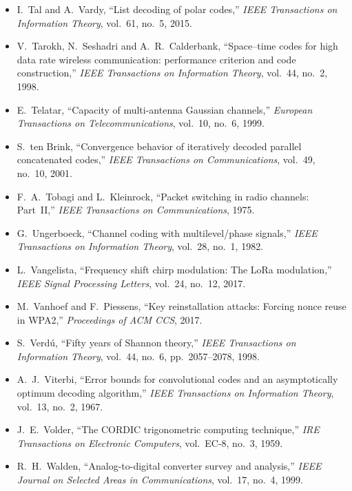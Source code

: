\begin{itemize}[leftmargin=1.5em,itemindent=-1.5em,itemsep=1.5pt plus 1pt,parsep=0pt,topsep=4pt,label={}]
\item I.~Tal and A.~Vardy, ``List decoding of polar codes,'' \emph{IEEE Transactions on Information Theory}, vol.~61, no.~5, 2015.
\item V.~Tarokh, N.~Seshadri and A.~R.~Calderbank, ``Space--time codes for high data rate wireless communication: performance criterion and code construction,'' \emph{IEEE Transactions on Information Theory}, vol.~44, no.~2, 1998.
\item E.~Telatar, ``Capacity of multi-antenna Gaussian channels,'' \emph{European Transactions on Telecommunications}, vol.~10, no.~6, 1999.
\item S.~ten Brink, ``Convergence behavior of iteratively decoded parallel concatenated codes,'' \emph{IEEE Transactions on Communications}, vol.~49, no.~10, 2001.
\item F.~A.~Tobagi and L.~Kleinrock, ``Packet switching in radio channels: Part~II,'' \emph{IEEE Transactions on Communications}, 1975.
\item G.~Ungerboeck, ``Channel coding with multilevel/phase signals,'' \emph{IEEE Transactions on Information Theory}, vol.~28, no.~1, 1982.
\item L.~Vangelista, ``Frequency shift chirp modulation: The LoRa modulation,'' \emph{IEEE Signal Processing Letters}, vol.~24, no.~12, 2017.
\item M.~Vanhoef and F.~Piessens, ``Key reinstallation attacks: Forcing nonce reuse in WPA2,'' \emph{Proceedings of ACM CCS}, 2017.
\item S.~Verd\'u, ``Fifty years of Shannon theory,'' \emph{IEEE Transactions on Information Theory}, vol.~44, no.~6, pp.~2057--2078, 1998.
\item A.~J.~Viterbi, ``Error bounds for convolutional codes and an asymptotically optimum decoding algorithm,'' \emph{IEEE Transactions on Information Theory}, vol.~13, no.~2, 1967.
\item J.~E.~Volder, ``The CORDIC trigonometric computing technique,'' \emph{IRE Transactions on Electronic Computers}, vol.~EC-8, no.~3, 1959.
\item R.~H.~Walden, ``Analog-to-digital converter survey and analysis,'' \emph{IEEE Journal on Selected Areas in Communications}, vol.~17, no.~4, 1999.

\end{itemize}
